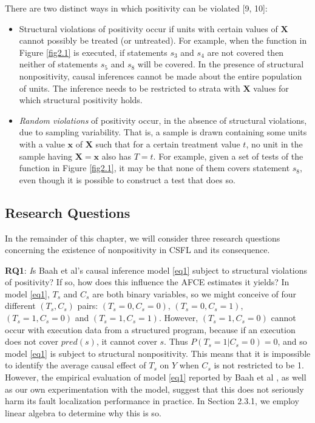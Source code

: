 There are two distinct ways in which positivity can be violated [9, 10]:
\begin{itemize}
\item Structural violations of positivity occur if units with certain values of $\mathbf{X}$ cannot possibly be treated (or untreated).   For example, when the function in Figure \ref{fig2.1} is executed, if statements $s_3$ and $s_4$ are not covered then neither of statements $s_5$ and $s_8$ will be covered.  In the presence of structural nonpositivity, causal inferences cannot be made about the entire population of units.  The inference needs to be restricted to strata with $\mathbf{X}$ values for which structural positivity holds.

\item {\it Random violations} of positivity occur, in the absence of structural violations, due to sampling variability. That is, a sample is drawn containing some units with a value $\mathbf{x}$ of $\mathbf{X}$ such that for a certain treatment value $t$, no unit in the sample having $\mathbf{X=x}$ also has $T=t$.   For example, given a set of tests of the function in Figure \ref{fig2.1}, it may be that none of them covers statement $s_8$, even though it is possible to construct a test that does so.
\end{itemize}

\subsection{Research Questions}\label{question}
In the remainder of this chapter, we will consider three research questions concerning the existence of nonpositivity in CSFL and its consequence.

{\bf RQ1}: {\textit Is Baah et al’s causal inference model \eqref{eq1} subject to structural violations of positivity?  If so, how does this influence the AFCE estimates it yields?} In model \eqref{eq1}, $T_s$ and $C_s$ are both binary variables, so we might conceive of four different $(T_s,C_s)$ pairs: $(T_s=0,C_s=0)$, $(T_s=0,C_s=1)$,  $(T_s=1,C_s=0)$ and $(T_s=1,C_s=1)$.  However, $(T_s=1,C_s=0)$ cannot occur with execution data from a structured program, because if an execution does not cover $pred(s)$, it cannot cover $s$.  Thus $P(T_s=1|C_s=0)=0$, and so model \eqref{eq1} is subject to structural nonpositivity.  This means that it is impossible to identify the average causal effect of $T_s$ on $Y$ when $C_s$ is not restricted to be 1.  However, the empirical evaluation of model \eqref{eq1} reported by Baah et al \cite{baah2010causal}, as well as our own experimentation with the model, suggest that this does not seriously harm its fault localization performance in practice.  In Section 2.3.1, we employ linear algebra to determine why this is so.

